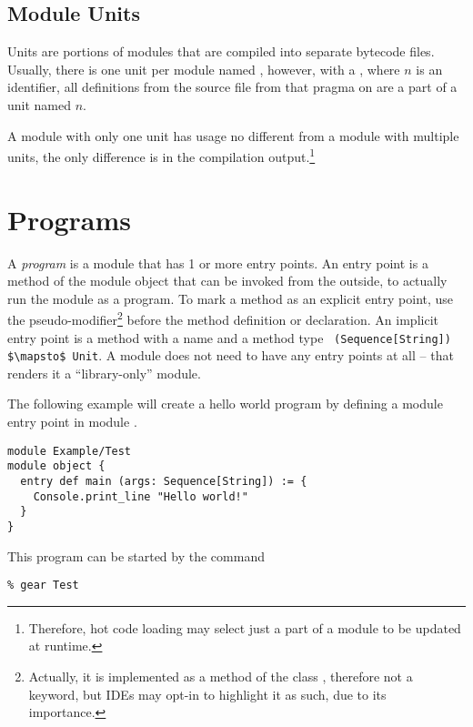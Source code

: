 \subsection{Module Units}
\label{sec:module-units}

Units are portions of modules that are compiled into separate bytecode files. Usually, there is one unit per module named , however, with a , where $n$ is an identifier, all definitions from the source file from that pragma on are a part of a unit named $n$. 

A module with only one unit has usage no different from a module with multiple units, the only difference is in the compilation output.\footnote{Therefore, hot code loading may select just a part of a module to be updated at runtime.}





\section{Programs}
\label{sec:programs}

A {\em program} is a module that has 1 or more entry points. An entry point is a method of the module object that can be invoked from the outside, to actually run the module as a program. To mark a method as an explicit entry point, use the  pseudo-modifier\footnote{Actually, it is implemented as a method of the class , therefore not a keyword, but IDEs may opt-in to highlight it as such, due to its importance.} before the method definition or declaration. An implicit entry point is a method with a name  and a method type ~\lstinline!(Sequence[String]) $\mapsto$ Unit!. A module does not need to have any entry points at all -- that renders it a ``library-only'' module. 

\example The following example will create a hello world program by defining a module entry point in module . 

\syntax\begin{lstlisting}[morekeywords={entry}]
module Example/Test
module object {
  entry def main (args: Sequence[String]) := {
    Console.print_line "Hello world!"
  }
}
\end{lstlisting}

This program can be started by the command
\begin{lstlisting}
% gear Test
\end{lstlisting}








